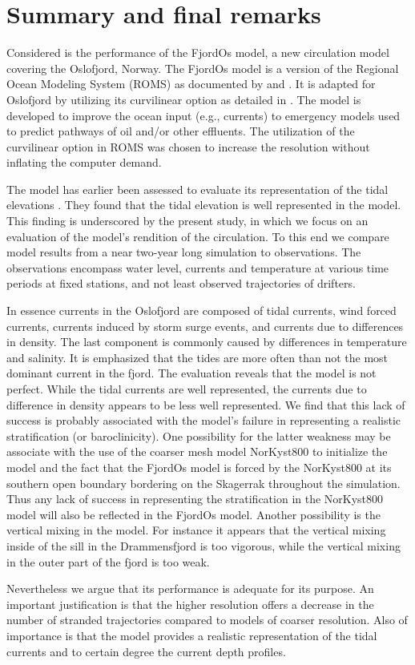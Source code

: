 \clearpage
\section{Summary and final remarks}
\label{sec:summa}
Considered is the performance of the FjordOs model, a new circulation model covering the Oslofjord, Norway. The FjordOs model is a version of the Regional Ocean Modeling System (ROMS) as documented by \cite{haidv:etal:2008} and \cite{shche:mcwil:2003, shche:mcwil:2005, shche:mcwil:2009}. It is adapted for Oslofjord by utilizing its curvilinear option as detailed in \cite{roed:etal:2016}. The model is developed to improve the ocean input (e.g., currents) to emergency models used to predict pathways of oil and/or other effluents. The utilization of the curvilinear option in ROMS was chosen to increase the resolution without inflating the computer demand. 

The model has earlier been assessed to evaluate its representation of the tidal elevations \citep{hjelm:etal:2017}. They found that the tidal elevation is well represented in the model. This finding is underscored by the present study, in which we focus on an evaluation of the model's rendition of the circulation. To this end we compare model results from a near two-year long simulation to observations. The observations encompass water level, currents and temperature at various time periods at fixed stations, and not least observed trajectories of drifters. 

In essence currents in the Oslofjord are composed of tidal currents, wind forced currents, currents induced by storm surge events, and currents due to differences in density. The last component is commonly caused by differences in temperature and salinity. It is emphasized that the tides are more often than not the most dominant current in the fjord. The evaluation reveals that the model is not perfect. While the tidal currents are well represented, the currents due to difference in density appears to be less well represented. We find that this lack of success is probably associated with the model's failure in representing a realistic stratification (or baroclinicity). One possibility for the latter weakness may be associate with the use of the coarser mesh model NorKyst800 to initialize the model and the fact that the FjordOs model is forced by the NorKyst800 at its southern open boundary bordering on the Skagerrak throughout the simulation. Thus any lack of success in representing the stratification in the NorKyst800 model will also be reflected in the FjordOs model. Another possibility is the vertical mixing in the model. For instance it appears that the vertical mixing inside of the sill in the Drammensfjord is too vigorous, while the vertical mixing in the outer part of the fjord is too weak. 

Nevertheless we argue that its performance is adequate for its purpose. An important justification is that the higher resolution offers a decrease in the number of stranded trajectories compared to models of coarser resolution. Also of importance is that the model provides a realistic representation of the tidal currents and to certain degree the current depth profiles.



